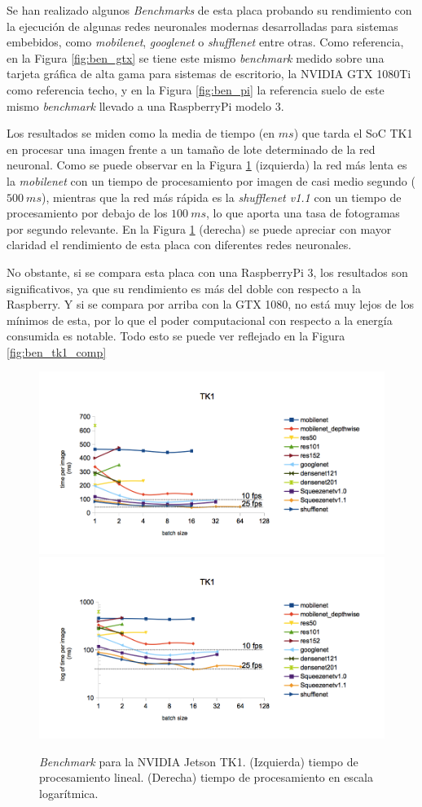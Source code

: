 Se han realizado algunos \textit{Benchmarks} de esta placa probando su rendimiento con la ejecución de algunas redes neuronales modernas desarrolladas para sistemas embebidos, como \textit{mobilenet}, \textit{googlenet} o \textit{shufflenet} entre otras. Como referencia, en la Figura \ref{fig:ben_gtx} se tiene este mismo \textit{benchmark} medido sobre una tarjeta gráfica de alta gama para sistemas de escritorio, la NVIDIA GTX 1080Ti como referencia techo, y en la Figura \ref{fig:ben_pi} la referencia suelo de este mismo \textit{benchmark} llevado a una RaspberryPi modelo 3.

Los resultados se miden como la media de tiempo (en $ms$) que tarda el SoC TK1 en procesar una imagen frente a un tamaño de lote determinado de la red neuronal. Como se puede observar en la Figura \ref{fig:ben_tk1} (izquierda) la red más lenta es la \textit{mobilenet} con un tiempo de procesamiento por imagen de casi medio segundo ($500\ ms$), mientras que la red más rápida es la \textit{shufflenet v1.1} con un tiempo de procesamiento por debajo de los $100\ ms$, lo que aporta una tasa de fotogramas por segundo relevante. En la Figura \ref{fig:ben_tk1} (derecha) se puede apreciar con mayor claridad el rendimiento de esta placa con diferentes redes neuronales.

No obstante, si se compara esta placa con una RaspberryPi 3, los resultados son significativos, ya que su rendimiento es más del doble con respecto a la Raspberry. Y si se compara por arriba con la GTX 1080, no está muy lejos de los mínimos de esta, por lo que el poder computacional con respecto a la energía consumida es notable. Todo esto se puede ver reflejado en la Figura \ref{fig:ben_tk1_comp}

\begin{figure}[htp]
    \centering
    \captionsetup{justification=centering}
    \includegraphics[width=.5\textwidth]{img/TK1_linear.png}\hfill
    \includegraphics[width=.5\textwidth]{img/TK1_log.png}
    \caption{\textit{Benchmark} para la NVIDIA Jetson TK1. (Izquierda) tiempo de procesamiento lineal. (Derecha) tiempo de procesamiento en escala logarítmica.}
    \label{fig:ben_tk1}
\end{figure}

